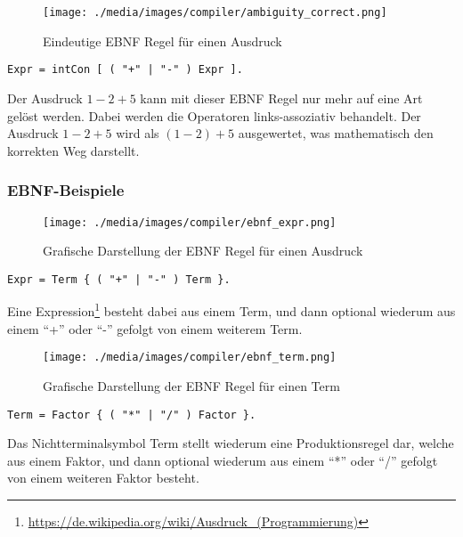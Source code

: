 
\begin{figure}[h]
\centering
\texttt{[image: ./media/images/compiler/ambiguity\_correct.png]}
\caption{Eindeutige EBNF Regel f\"ur einen Ausdruck}
\label{compiler_ambiguity_correct}
\end{figure}

\begin{lstlisting}[language=EBNF]
Expr = intCon [ ( "+" | "-" ) Expr ].
\end{lstlisting}

Der Ausdruck $1-2+5$ kann mit dieser EBNF Regel nur mehr auf eine Art gelöst werden. Dabei werden die Operatoren links-assoziativ behandelt. Der Ausdruck $1-2+5$ wird als $(1-2)+5$ ausgewertet, was mathematisch den korrekten Weg darstellt.

\subsubsection{EBNF-Beispiele}

\begin{figure}[h]
\centering
\texttt{[image: ./media/images/compiler/ebnf\_expr.png]}
\caption{Grafische Darstellung der EBNF Regel f\"ur einen Ausdruck}
\label{compiler_ebnf_expr}
\end{figure}

\begin{lstlisting}[language=EBNF]
Expr = Term { ( "+" | "-" ) Term }.
\end{lstlisting}

Eine Expression\footnote{\url{https://de.wikipedia.org/wiki/Ausdruck_(Programmierung)}} besteht dabei aus einem Term, und dann optional wiederum aus einem ``+'' oder ``-'' gefolgt von einem weiterem Term.

\begin{figure}[h]
\centering
\texttt{[image: ./media/images/compiler/ebnf\_term.png]}
\caption{Grafische Darstellung der EBNF Regel f\"ur einen Term}
\label{compiler_ebnf_term}
\end{figure}

\begin{lstlisting}[language=EBNF]
Term = Factor { ( "*" | "/" ) Factor }.
\end{lstlisting}

Das Nichtterminalsymbol Term stellt wiederum eine Produktionsregel dar, welche aus einem Faktor, und dann optional wiederum aus einem ``*'' oder ``/'' gefolgt von einem weiteren Faktor besteht.

